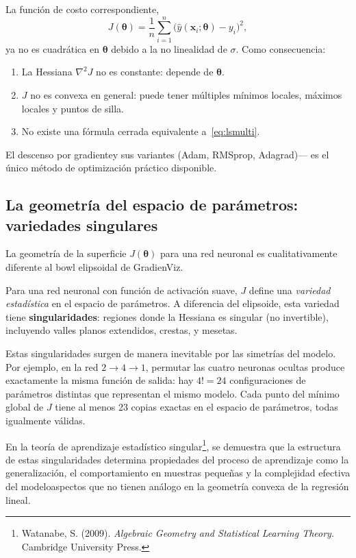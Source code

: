\documentclass[12pt, a4paper]{article}
\begin{document}
La función de costo correspondiente,
\[
  J(\boldsymbol{\theta}) = \frac{1}{n}\sum_{i=1}^{n}
    \bigl(\hat{y}(\mathbf{x}_i;\boldsymbol{\theta}) - y_i\bigr)^2,
\]
ya no es cuadrática en $\boldsymbol{\theta}$ debido a la no linealidad de $\sigma$.
Como consecuencia:

\begin{enumerate}[label=(\roman*)]
  \item La Hessiana $\nabla^2 J$ no es constante: depende de $\boldsymbol{\theta}$.
  \item $J$ no es convexa en general: puede tener múltiples mínimos locales,
    máximos locales y puntos de silla.
  \item No existe una fórmula cerrada equivalente a~\eqref{eq:lsmulti}.
\end{enumerate}

El descenso por gradiente\textemdash y sus variantes (Adam, RMSprop, Adagrad)---
es el único método de optimización práctico disponible.

\subsection{La geometría del espacio de parámetros: variedades singulares}

La geometría de la superficie $J(\boldsymbol{\theta})$ para una red neuronal
es cualitativamente diferente al bowl elipsoidal de GradienViz.

Para una red neuronal con función de activación suave, $J$ define una
\emph{variedad estadística} en el espacio de parámetros. A diferencia del
elipsoide, esta variedad tiene \textbf{singularidades}: regiones donde la
Hessiana es singular (no invertible), incluyendo valles planos extendidos,
crestas, y mesetas.

Estas singularidades surgen de manera inevitable por las simetrías del modelo.
Por ejemplo, en la red $2\to 4\to 1$, permutar las cuatro neuronas ocultas
produce exactamente la misma función de salida: hay $4! = 24$ configuraciones
de parámetros distintas que representan el mismo modelo. Cada punto del mínimo
global de $J$ tiene al menos 23 copias exactas en el espacio de parámetros,
todas igualmente válidas.

En la teoría de aprendizaje estadístico singular\footnote{%
  Watanabe, S. (2009). \textit{Algebraic Geometry and Statistical Learning Theory}.
  Cambridge University Press.}, se demuestra que la estructura de estas
singularidades determina propiedades del proceso de aprendizaje como
la generalización, el comportamiento en muestras pequeñas y la
complejidad efectiva del modelo\textemdash aspectos que no tienen
análogo en la geometría convexa de la regresión lineal.
\end{document}
